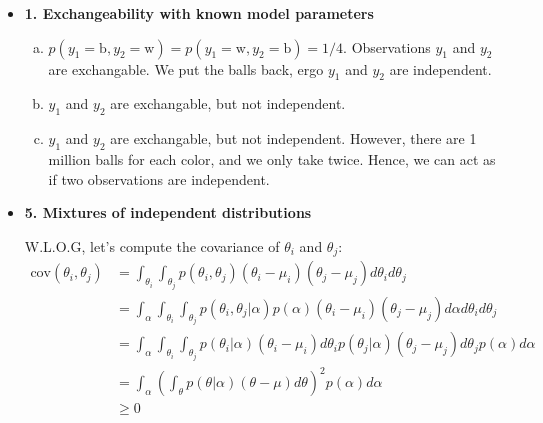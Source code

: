 \documentclass{article}
\begin{document}
\begin{itemize}

\item \textbf{1. Exchangeability with known model parameters}
  \begin{enumerate}[(a)]
    \item $p(y_1 = \text{b}, y_2 = \text{w}) = p(y_1=\text{w}, y_2=\text{b}) = 1/4$. Observations $y_1$ and $y_2$ are exchangable. We put the balls back, ergo $y_1$ and $y_2$ are independent.
    \item $y_1$ and $y_2$ are exchangable, but not independent. 
    \item $y_1$ and $y_2$ are exchangable, but not independent. However, there are 1 million balls for each color, and we only take twice. Hence, we can act as if two observations are independent.
    \end{enumerate}

\item \textbf{5. Mixtures of independent distributions}

  W.L.O.G, let's compute the covariance of $\theta_i$ and $\theta_j$:
  \begin{align*}
    \text{cov}(\theta_i, \theta_j) &= \int_{\theta_i} \int_{\theta_j} p(\theta_i, \theta_j) (\theta_i - \mu_i) (\theta_j - \mu_j) d\theta_i d\theta_j \\
  &=  \int_{\alpha} \int_{\theta_i} \int_{\theta_j} p(\theta_i, \theta_j | \alpha) p(\alpha) (\theta_i - \mu_i) (\theta_j - \mu_j) d\alpha d\theta_i d\theta_j  \\
  &= \int_{\alpha} \int_{\theta_i} \int_{\theta_j} p(\theta_i|\alpha) (\theta_i - \mu_i) d\theta_i p(\theta_j | \alpha) (\theta_j - \mu_j) d\theta_j p(\alpha) d\alpha \\
  &= \int_{\alpha} \left(\int_{\theta} p(\theta | \alpha) (\theta - \mu) d\theta \right)^2 p(\alpha) d\alpha \\
  &\geq 0
  \end{align*} 


\end{itemize}
\end{document}
